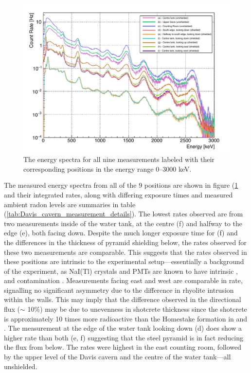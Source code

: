 \begin{figure}[t!]
    \centering
    \includegraphics[scale=0.80]{Chapter_3/Figures/Davis_cavern_spectra.pdf}
    \caption[The energy spectra for all nine measurements labeled with their corresponding positions in the energy range 0–3000 keV.]
    {The energy spectra for all nine measurements labeled with their corresponding positions in the energy range 0–3000 keV.}
    \label{fig:davis_cavern_spectra}
\end{figure}
%
The measured energy spectra from all of the 9 positions are shown in figure (\ref{fig:davis_cavern_spectra} and their integrated rates, along with differing exposure times and measured ambient radon levels are summaries in table (\ref{tab:Davis_cavern_measurement_details}). The lowest rates observed are from two measurements inside of the water tank, at the centre (f) and halfway to the edge (e), both facing down. Despite the much longer exposure time for (f) and the differences in the thickness of pyramid shielding below, the rates observed for these two measurements are comparable. This suggests that the rates observed in these positions are intrinsic to the experimental setup---essentially a background of the experiment, as NaI(Tl) crystals and PMTs are known to have intrinsic \KFZ{}, \UTTE{} and \ThTTT{} contamination \cite{Kim:2014toa}. Measurements facing east and west are comparable in rate, signalling no significant asymmetry due to the difference in rhyolite intrusion within the walls. This may imply that the difference observed in the directional flux ($\sim$ 10\%) may be due to unevenness in shotcrete thickness since the shotcrete is approximately 10 times more radioactive than the Homestake formation in \UTTE{} and \ThTTT{}. The measurement at the edge of the water tank looking down (d) does show a higher rate than both (e, f) suggesting that the steel pyramid is in fact reducing the flux from below. The rates were highest in the east counting room, followed by the upper level of the Davis cavern and the centre of the water tank---all unshielded.

